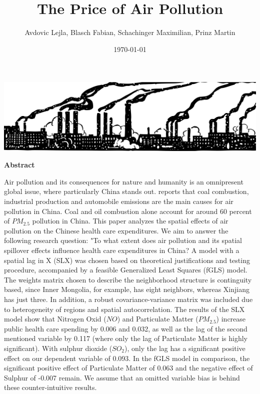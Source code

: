 \documentclass[
]{article}
\title{The Price of Air Pollution}
\author{Avdovic Lejla, Blasch Fabian, Schachinger Maximilian, Prinz Martin}
\date{\today}
\begin{document}
	\maketitle
	
	\begin{center}
		\includegraphics[width = 380pt]{pollution.png} 
	\end{center}
	\thispagestyle{empty}
	\vspace*{12pt}
	\begin{center}
		\textbf{Abstract} 
	\end{center}
	Air pollution and its consequences for nature and humanity is an omnipresent global issue, where particularly China stands out. \cite{rasch_under_nodate} reports that coal combustion, industrial production
	and automobile emissions are the main causes for
	air pollution in China. Coal and oil combustion alone account for around 60 percent of $PM_{2.5}$ pollution in China.
	This paper analyzes the spatial effects of air pollution on the Chinese health care expenditures. We aim to answer the following research question: "To what extent does air pollution and its spatial spillover effects influence health care expenditures in China? A model with a spatial lag in X (SLX) was chosen based on theoretical justifications and testing procedure, accompanied by a feasible Generalized Least Squares (fGLS) model. 
	The weights matrix chosen to describe the neighborhood structure is continguity based, since Inner Mongolia, for example, has eight neighbors, whereas Xinjiang has just three. 
	In addition, a robust covariance-variance matrix was included due to heterogeneity of regions and spatial autocorrelation. The results of the SLX model show that Nitrogen Oxid ($NO$) and Particulate Matter ($PM_{2.5}$)
	increase public health care spending by 0.006 and 0.032, as well as the lag of the second mentioned variable by 0.117 (where only the lag of Particulate Matter is highly significant). With sulphur dioxide ($SO_2$), only the lag has a significant positive effect on our dependent variable of 0.093. In the fGLS model in comparison, the significant positive effect of Particulate Matter of 0.063 and the negative effect of Sulphur of -0.007 remain. We assume that an omitted variable bias is behind these counter-intuitive results.
\end{document}
